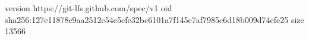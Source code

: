 version https://git-lfs.github.com/spec/v1
oid sha256:127e11878c9aa2512e54e5cfe32bc6101a7f145e7af7985c6d18b009d74efe25
size 13566
